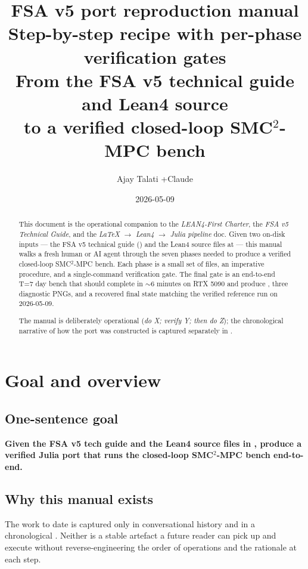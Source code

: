 \documentclass[11pt,a4paper]{article}
\title{FSA v5 port reproduction manual\\
       \large Step-by-step recipe with per-phase verification gates\\
       From the FSA v5 technical guide and Lean4 source\\
       to a verified closed-loop SMC$^2$-MPC bench}
\author{Ajay Talati \quad+\quad Claude}
\date{2026-05-09}
\begin{document}
\maketitle

\begin{abstract}
This document is the operational companion to the
\emph{LEAN4-First Charter}, the \emph{FSA v5 Technical Guide}, and
the \emph{LaTeX $\to$ Lean4 $\to$ Julia pipeline} doc. Given two
on-disk inputs --- the FSA v5 technical guide
() and the Lean4
source files at  --- this manual walks a fresh human
or AI agent through the seven phases needed to produce a verified
closed-loop SMC$^2$-MPC bench. Each phase is a small set of files,
an imperative procedure, and a single-command verification gate.
The final gate is an end-to-end T=7 day bench that should complete
in $\sim 6$ minutes on RTX 5090 and produce
, three diagnostic PNGs, and a recovered final
state matching the verified reference run on 2026-05-09.

The manual is deliberately operational (\emph{do X; verify Y; then
do Z}); the chronological narrative of how the port was
constructed is captured separately in
.
\end{abstract}

\tableofcontents
\clearpage


\section{Goal and overview}
\label{sec:overview}

\subsection{One-sentence goal}

\textbf{Given the FSA v5 tech guide and the Lean4 source files in
, produce a verified Julia port that runs the
closed-loop SMC$^2$-MPC bench end-to-end.}

\subsection{Why this manual exists}

The work to date is captured only in conversational history and in a
chronological . Neither is a stable artefact a
future reader can pick up and execute without reverse-engineering
the order of operations and the rationale at each step.
\end{document}
